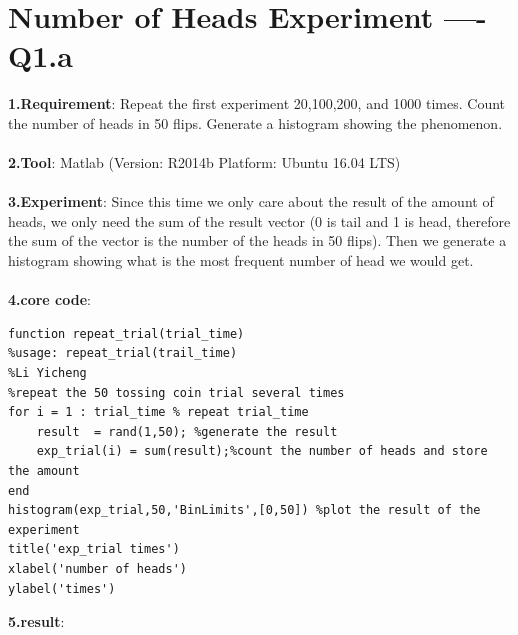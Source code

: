 \documentclass[twoside]{article}
\begin{document}
\section{Number of Heads Experiment ---- Q1.a}
\textbf{1.Requirement}: Repeat the first experiment 20,100,200, and 1000 times. Count the number of heads in 50 flips. Generate a histogram showing the phenomenon.\\ \\
\textbf{2.Tool}: Matlab (Version: R2014b Platform: Ubuntu 16.04 LTS)\\ \\
\textbf{3.Experiment}: Since this time we only care about the result of the amount of heads, we only need the sum of the result vector (0 is tail and 1 is head, therefore the sum of the vector is the number of the heads in 50 flips). Then we generate a histogram showing what is the most frequent number of head we would get.\\ \\
\textbf{4.core code}:
\begin{lstlisting}
function repeat_trial(trial_time)
%usage: repeat_trial(trail_time)
%Li Yicheng
%repeat the 50 tossing coin trial several times
for i = 1 : trial_time % repeat trial_time 
    result  = rand(1,50); %generate the result
    exp_trial(i) = sum(result);%count the number of heads and store the amount
end
histogram(exp_trial,50,'BinLimits',[0,50]) %plot the result of the experiment
title('exp_trial times')
xlabel('number of heads')
ylabel('times')
\end{lstlisting}
\textbf{5.result}: 
\end{document}
